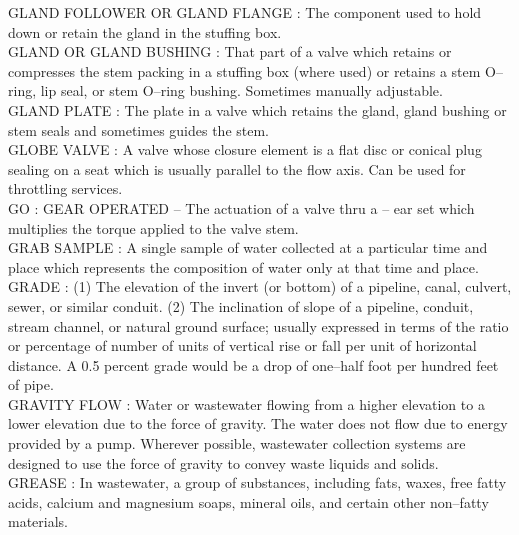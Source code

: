 \vspace{0.15cm}
GLAND FOLLOWER OR GLAND FLANGE :   The component used to hold down or retain the gland in the stuffing box.\\
\vspace{0.15cm}
GLAND OR GLAND BUSHING :   That part of a valve which retains or compresses the stem packing in a stuffing box (where used) or retains a stem O–ring, lip seal, or stem O–ring bushing. Sometimes manually adjustable.\\
\vspace{0.15cm}
GLAND PLATE :   The plate in a valve which retains the gland, gland bushing or stem seals and sometimes guides the stem.\\
\vspace{0.15cm}
GLOBE VALVE :   A valve whose closure element is a flat disc or conical plug sealing on a seat which is usually parallel to the flow axis. Can be used for throttling services.\\
\vspace{0.15cm}
GO :  GEAR OPERATED –  The actuation of a valve thru a – ear set which multiplies the torque applied to the valve stem.\\
\vspace{0.15cm}
GRAB SAMPLE :  A single sample of water collected at a particular time and place which represents the composition of water only at that time and place.\\
\vspace{0.15cm}
GRADE :  (1) The elevation of the invert (or bottom) of a pipeline, canal, culvert, sewer, or similar conduit. (2) The inclination of slope of a pipeline, conduit, stream channel, or natural ground surface; usually expressed in terms of the ratio or percentage of number of units of vertical rise or fall per unit of horizontal distance. A 0.5 percent grade would be a drop of one–half foot per hundred feet of pipe. \\
\vspace{0.15cm}
GRAVITY FLOW :  Water or wastewater flowing from a higher elevation to a lower elevation due to the force of gravity. The water does not flow due to energy provided by a pump. Wherever possible, wastewater collection systems are designed to use the force of gravity to convey waste liquids and solids. \\
\vspace{0.15cm}
GREASE :   In wastewater, a group of substances, including fats, waxes, free fatty acids, calcium and magnesium soaps, mineral oils, and certain other non–fatty materials.\\
